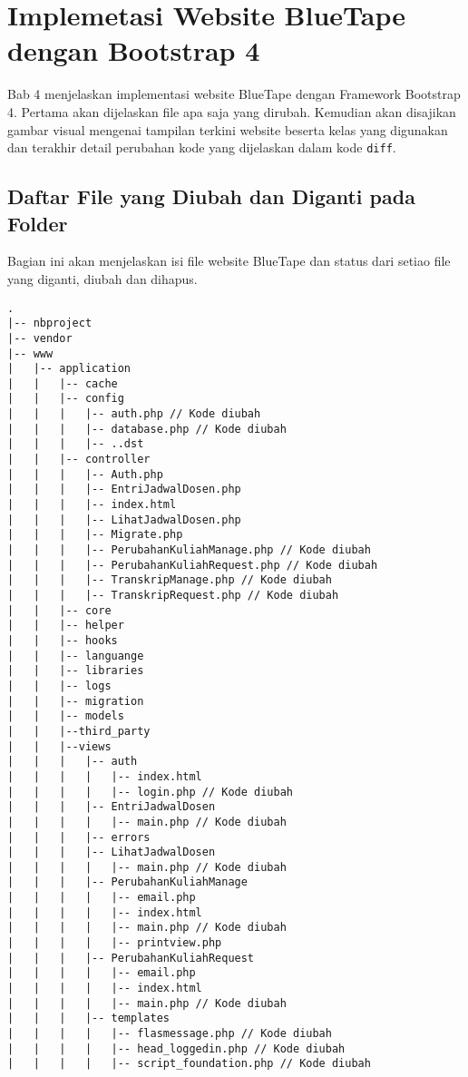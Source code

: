 \chapter{Implemetasi Website BlueTape dengan Bootstrap 4}
Bab 4 menjelaskan implementasi website BlueTape dengan Framework Bootstrap 4. Pertama akan dijelaskan file apa saja yang dirubah. Kemudian akan disajikan gambar visual mengenai tampilan terkini website beserta kelas yang digunakan dan terakhir detail perubahan kode yang dijelaskan dalam kode \texttt{diff}.
\section{Daftar File yang Diubah dan Diganti pada Folder}
Bagian ini akan menjelaskan isi file website BlueTape dan status dari setiao file yang diganti, diubah dan dihapus.
\begin{lstlisting}[basicstyle=\ttfamily, frame=single, caption=Perubahan isi folder BlueTape,
columns=fullflexible, keepspaces=true, breaklines=true, label=ls:8]
.
|-- nbproject
|-- vendor
|-- www
|   |-- application
|   |   |-- cache
|   |   |-- config
|   |   |   |-- auth.php // Kode diubah
|   |   |   |-- database.php // Kode diubah
|   |   |   |-- ..dst
|   |   |-- controller
|   |   |   |-- Auth.php
|   |   |   |-- EntriJadwalDosen.php
|   |   |   |-- index.html
|   |   |   |-- LihatJadwalDosen.php
|   |   |   |-- Migrate.php
|   |   |   |-- PerubahanKuliahManage.php // Kode diubah
|   |   |   |-- PerubahanKuliahRequest.php // Kode diubah
|   |   |   |-- TranskripManage.php // Kode diubah
|   |   |   |-- TranskripRequest.php // Kode diubah
|   |   |-- core
|   |   |-- helper
|   |   |-- hooks
|   |   |-- languange
|   |   |-- libraries
|   |   |-- logs
|   |   |-- migration
|   |   |-- models
|   |   |--third_party
|   |   |--views
|   |   |   |-- auth
|   |   |   |   |-- index.html
|   |   |   |   |-- login.php // Kode diubah
|   |   |   |-- EntriJadwalDosen
|   |   |   |   |-- main.php // Kode diubah
|   |   |   |-- errors
|   |   |   |-- LihatJadwalDosen
|   |   |   |   |-- main.php // Kode diubah
|   |   |   |-- PerubahanKuliahManage
|   |   |   |   |-- email.php
|   |   |   |   |-- index.html
|   |   |   |   |-- main.php // Kode diubah
|   |   |   |   |-- printview.php
|   |   |   |-- PerubahanKuliahRequest
|   |   |   |   |-- email.php
|   |   |   |   |-- index.html
|   |   |   |   |-- main.php // Kode diubah
|   |   |   |-- templates
|   |   |   |   |-- flasmessage.php // Kode diubah
|   |   |   |   |-- head_loggedin.php // Kode diubah
|   |   |   |   |-- script_foundation.php // Kode diubah

\end{lstlisting}
